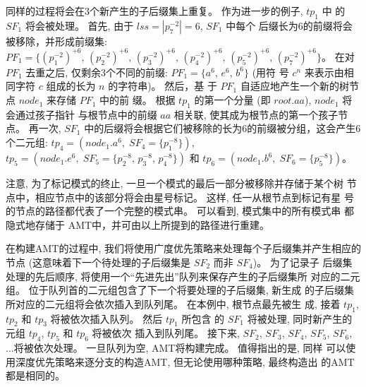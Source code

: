 同样的过程将会在3个新产生的子后缀集上重复。 作为进一步的例子, $tp_1$ 中
的 $SF_1$ 将会被处理。 首先, 由于 $lss = |p_7^{-2}| = 6$, $SF_1$ 中每个
后缀长为6的前缀将会被移除，并形成前缀集:
$PF_1 = \{(p_1^{-2})^{+6},\, (p_2^{-2})^{+6},\, (p_3^{-2})^{+6},\,
(p_4^{-2})^{+6},\, (p_5^{-2})^{+6},\, (p_7^{-2})^{+6}\}$。 在对 $PF_1$
去重之后, 仅剩余3个不同的前缀: $PF_1 = \{a^6,\, e^6,\, b^6\}$ (用符
号 $c^n$ 来表示由相同字符 $c$ 组成的长为 $n$ 的字符串)。  然后，基
于 $PF_1$ 自适应地产生一个新的树节点 $node_1$ 来存储 $PF_1$ 中的前
缀。 根据 $tp_1$ 的第一个分量 (即 $root.aa$), $node_1$ 将会通过孩子指针
与根节点中的前缀 $aa$ 相关联, 使其成为根节点的第一个孩子节点。 再一次,
$SF_1$ 中的后缀将会根据它们被移除的长为6的前缀被分组，这会产生6个二元组:
$tp_4 = (node_1.a^6,\; SF_4=\{p_1^{-8}\})$,
$tp_5 = (node_1.e^6,\; SF_5=\{p_2^{-8},\, p_3^{-8},\,
p_4^{-8}\})$ 和 $tp_6 = (node_1.b^6,\; SF_6=\{p_5^{-8}\})$。

注意, 为了标记模式的终止, 一旦一个模式的最后一部分被移除并存储于某个树
节点中，相应节点中的该部分将会由星号标记。 这样, 任一从根节点到标记有星
号的节点的路径都代表了一个完整的模式串。 可以看到, 模式集中的所有模式串
都隐式地存储于 AMT中，并可由以上所提到的路径进行重建。

在构建AMT的过程中, 我们将使用广度优先策略来处理每个子后缀集并产生相应的
节点 (这意味着下一个待处理的子后缀集是 $SF_2$ 而非 $SF_4$)。 为了记录子
后缀集处理的先后顺序, 将使用一个“先进先出”队列来保存产生的子后缀集所
对应的二元组。 位于队列首的二元组包含了下一个将要处理的子后缀集, 新生成
的子后缀集所对应的二元组将会依次插入到队列尾。 在本例中, 根节点最先被生
成, 接着 $tp_1$, $tp_2$ 和 $tp_3$ 将被依次插入队列。 然后 $tp_1$ 所包含
的 $SF_1$ 将被处理, 同时新产生的元组 $tp_4$, $tp_5$ 和 $tp_6$ 将被依次
插入到队列尾。 接下来, $SF_2$, $SF_3$, $SF_4$, $SF_5$, $SF_6$,
$\dots$将被依次处理。 一旦队列为空, AMT将构建完成。 值得指出的是, 同样
可以使用深度优先策略来逐分支的构造AMT, 但无论使用哪种策略, 最终构造出
的AMT都是相同的。


